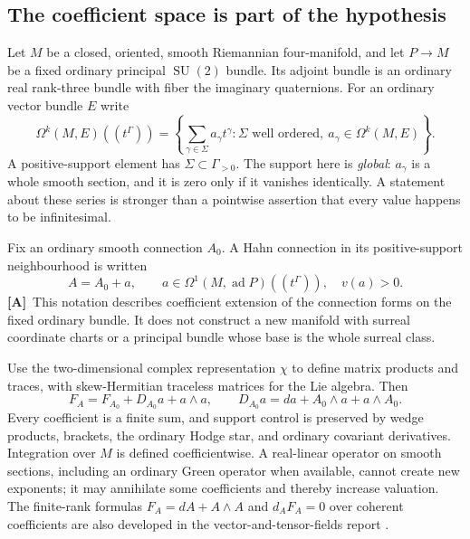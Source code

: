 \documentclass[11pt,oneside]{article}
\numberwithin{equation}{section}
\theoremstyle{plain}
\theoremstyle{definition}
\theoremstyle{remark}
\DeclareMathOperator{\SU}{SU}
\DeclareMathOperator{\ad}{ad}
\newcommand{\TA}{\textcolor{TierA}{\textsf{\bfseries[A]}}}
\begin{document}
\subsection{The coefficient space is part of the hypothesis}
Let $M$ be a closed, oriented, smooth Riemannian four-manifold, and let $P\to M$ be a fixed ordinary principal $\SU(2)$ bundle. Its adjoint bundle is an ordinary real rank-three bundle with fiber the imaginary quaternions. For an ordinary vector bundle $E$ write
\begin{equation}
 \Omega^k(M,E)((t^\Gamma))
 =\left\{\sum_{\gamma\in\Sigma}a_\gamma t^\gamma:
 \Sigma\text{ well ordered},\ a_\gamma\in\Omega^k(M,E)\right\}.
\end{equation}
A positive-support element has $\Sigma\subset\Gamma_{>0}$. The support here is \emph{global}: $a_\gamma$ is a whole smooth section, and it is zero only if it vanishes identically. A statement about these series is stronger than a pointwise assertion that every value happens to be infinitesimal.

Fix an ordinary smooth connection $A_0$. A Hahn connection in its positive-support neighbourhood is written
\begin{equation}\label{qgs:obs:eq:connection}
 A=A_0+a,\qquad
 a\in\Omega^1(M,\ad P)((t^\Gamma)),\quad v(a)>0.
\end{equation}
\TA\ This notation describes coefficient extension of the connection forms on the fixed ordinary bundle. It does not construct a new manifold with surreal coordinate charts or a principal bundle whose base is the whole surreal class.

Use the two-dimensional complex representation $\chi$ to define matrix products and traces, with skew-Hermitian traceless matrices for the Lie algebra. Then
\begin{equation}\label{qgs:obs:eq:curvature}
 F_A=F_{A_0}+D_{A_0}a+a\wedge a,
 \qquad D_{A_0}a=da+A_0\wedge a+a\wedge A_0.
\end{equation}
Every coefficient is a finite sum, and support control is preserved by wedge products, brackets, the ordinary Hodge star, and ordinary covariant derivatives. Integration over $M$ is defined coefficientwise. A real-linear operator on smooth sections, including an ordinary Green operator when available, cannot create new exponents; it may annihilate some coefficients and thereby increase valuation. The finite-rank formulas $F_A=dA+A\wedge A$ and $d_AF_A=0$ over coherent coefficients are also developed in the vector-and-tensor-fields report \cite{repoVTF}.
\end{document}
